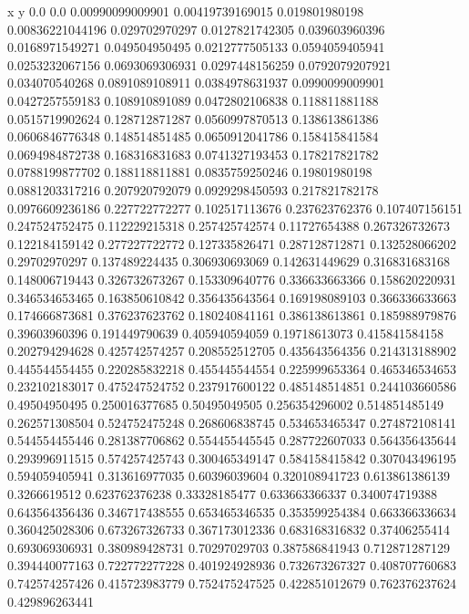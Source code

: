              x                y
            0.0              0.0
0.00990099009901  0.00419739169015
 0.019801980198  0.00836221044196
 0.029702970297  0.0127821742305
 0.039603960396  0.0168971549271
 0.049504950495  0.0212777505133
0.0594059405941  0.0253232067156
0.0693069306931  0.0297448156259
0.0792079207921   0.034070540268
0.0891089108911  0.0384978631937
0.0990099009901  0.0427257559183
 0.108910891089  0.0472802106838
 0.118811881188  0.0515719902624
 0.128712871287  0.0560997870513
 0.138613861386  0.0606846776348
 0.148514851485  0.0650912041786
 0.158415841584  0.0694984872738
 0.168316831683  0.0741327193453
 0.178217821782  0.0788199877702
 0.188118811881  0.0835759250246
  0.19801980198  0.0881203317216
 0.207920792079  0.0929298450593
 0.217821782178  0.0976609236186
 0.227722772277   0.102517113676
 0.237623762376   0.107407156151
 0.247524752475   0.112229215318
 0.257425742574    0.11727654388
 0.267326732673   0.122184159142
 0.277227722772   0.127335826471
 0.287128712871   0.132528066202
  0.29702970297   0.137489224435
 0.306930693069   0.142631449629
 0.316831683168   0.148006719443
 0.326732673267   0.153309640776
 0.336633663366   0.158620220931
 0.346534653465   0.163850610842
 0.356435643564   0.169198089103
 0.366336633663   0.174666873681
 0.376237623762   0.180240841161
 0.386138613861   0.185988979876
  0.39603960396   0.191449790639
 0.405940594059    0.19718613073
 0.415841584158   0.202794294628
 0.425742574257   0.208552512705
 0.435643564356   0.214313188902
 0.445544554455   0.220285832218
 0.455445544554   0.225999653364
 0.465346534653   0.232102183017
 0.475247524752   0.237917600122
 0.485148514851   0.244103660586
  0.49504950495   0.250016377685
  0.50495049505   0.256354296002
 0.514851485149   0.262571308504
 0.524752475248   0.268606838745
 0.534653465347   0.274872108141
 0.544554455446   0.281387706862
 0.554455445545   0.287722607033
 0.564356435644   0.293996911515
 0.574257425743   0.300465349147
 0.584158415842   0.307043496195
 0.594059405941   0.313616977035
  0.60396039604   0.320108941723
 0.613861386139     0.3266619512
 0.623762376238    0.33328185477
 0.633663366337   0.340074719388
 0.643564356436   0.346717438555
 0.653465346535   0.353599254384
 0.663366336634   0.360425028306
 0.673267326733   0.367173012336
 0.683168316832    0.37406255414
 0.693069306931   0.380989428731
  0.70297029703   0.387586841943
 0.712871287129   0.394440077163
 0.722772277228   0.401924928936
 0.732673267327   0.408707760683
 0.742574257426   0.415723983779
 0.752475247525   0.422851012679
 0.762376237624   0.429896263441

